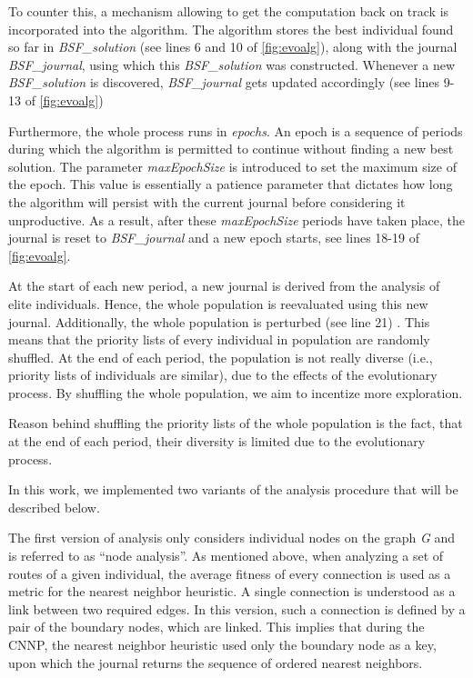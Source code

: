 \documentclass[twoside]{ctuthesis}
\theoremstyle{plain}
\theoremstyle{definition}
\theoremstyle{note}
\begin{document}
To counter this, a mechanism allowing to get the computation back on track is incorporated into the algorithm. The algorithm stores the best individual found so far in \emph{BSF\_solution} (see lines 6 and 10 of \ref{fig:evoalg}), along with the journal \emph{BSF\_journal}, using which this \emph{BSF\_solution} was constructed. Whenever a new \emph{BSF\_solution} is discovered, \emph{BSF\_journal} gets updated accordingly (see lines 9-13 of \ref{fig:evoalg})

Furthermore, the whole process runs in \emph{epochs}. An epoch is a sequence of periods during which the algorithm is permitted to continue without finding a new best solution. The parameter \emph{maxEpochSize} is introduced to set the maximum size of the epoch. This value is essentially a patience parameter that dictates how long the algorithm will persist with the current journal before considering it unproductive. As a result, after these \emph{maxEpochSize} periods have taken place, the journal is reset to \emph{BSF\_journal} and a new epoch starts, see lines 18-19 of \ref{fig:evoalg}.

At the start of each new period, a new journal is derived from the analysis of elite individuals. Hence, the whole population is reevaluated using this new journal. Additionally, the whole population is perturbed (see line 21) . This means that the priority lists of every individual in population are randomly shuffled. At the end of each period, the population is not really diverse (i.e., priority lists of individuals are similar), due to the effects of the evolutionary process. By shuffling the whole population, we aim to incentize more exploration.

 Reason behind shuffling the priority lists of the whole population is the fact, that at the end of each period, their diversity is limited due to the evolutionary process.

In this work, we implemented two variants of the analysis procedure that will be described below.

The first version of analysis only considers individual nodes on the graph \emph{G} and is referred to as ``node analysis''. As mentioned above, when analyzing a set of routes of a given individual, the average fitness of every connection is used as a metric for the nearest neighbor heuristic. A single connection is understood as a link between two required edges. 
In this version, such a connection is defined by a pair of the boundary nodes, which are linked. This implies that during the CNNP, the nearest neighbor heuristic used only the boundary node as a key, upon which the journal returns the sequence of ordered nearest neighbors.
\end{document}
